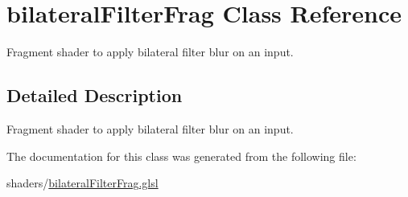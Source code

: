 \hypertarget{classbilateral_filter_frag}{\section{bilateral\-Filter\-Frag Class Reference}
\label{classbilateral_filter_frag}
}


Fragment shader to apply bilateral filter blur on an input.  




\subsection{Detailed Description}
Fragment shader to apply bilateral filter blur on an input. 

The documentation for this class was generated from the following file\-:\begin{DoxyCompactItemize}
\item 
shaders/\hyperlink{bilateral_filter_frag_8glsl}{bilateral\-Filter\-Frag.\-glsl}\end{DoxyCompactItemize}
